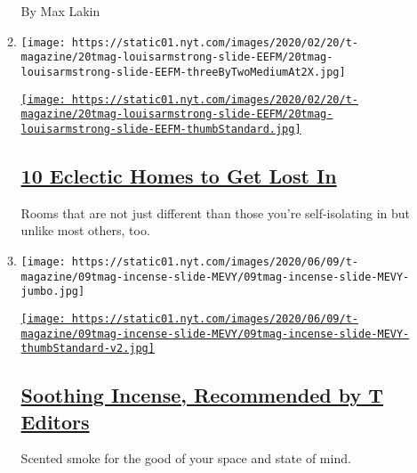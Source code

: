 \begin{enumerate}
\begin{enumerate}
    By Max Lakin
  \item
    \texttt{[image: https://static01.nyt.com/images/2020/02/20/t-magazine/20tmag-louisarmstrong-slide-EEFM/20tmag-louisarmstrong-slide-EEFM-threeByTwoMediumAt2X.jpg]}

    \href{/2020/05/08/t-magazine/house-tours-coronavirus-distraction.html}{\texttt{[image: https://static01.nyt.com/images/2020/02/20/t-magazine/20tmag-louisarmstrong-slide-EEFM/20tmag-louisarmstrong-slide-EEFM-thumbStandard.jpg]}}

    \hypertarget{10-eclectic-homes-to-get-lost-in}{%
    \subsection{\texorpdfstring{\href{/2020/05/08/t-magazine/house-tours-coronavirus-distraction.html}{10
    Eclectic Homes to Get Lost
    In}}{10 Eclectic Homes to Get Lost In}}\label{10-eclectic-homes-to-get-lost-in}}

    Rooms that are not just different than those you're self-isolating
    in but unlike most others, too.
  \item
    \texttt{[image: https://static01.nyt.com/images/2020/06/09/t-magazine/09tmag-incense-slide-MEVY/09tmag-incense-slide-MEVY-jumbo.jpg]}

    \href{/2020/06/09/t-magazine/best-incense.html}{\texttt{[image: https://static01.nyt.com/images/2020/06/09/t-magazine/09tmag-incense-slide-MEVY/09tmag-incense-slide-MEVY-thumbStandard-v2.jpg]}}

    \hypertarget{soothing-incense-recommended-by-t-editors}{%
    \subsection{\texorpdfstring{\href{/2020/06/09/t-magazine/best-incense.html}{Soothing
    Incense, Recommended by T
    Editors}}{Soothing Incense, Recommended by T Editors}}\label{soothing-incense-recommended-by-t-editors}}

    Scented smoke for the good of your space and state of mind.
  \end{enumerate}
\end{enumerate}

